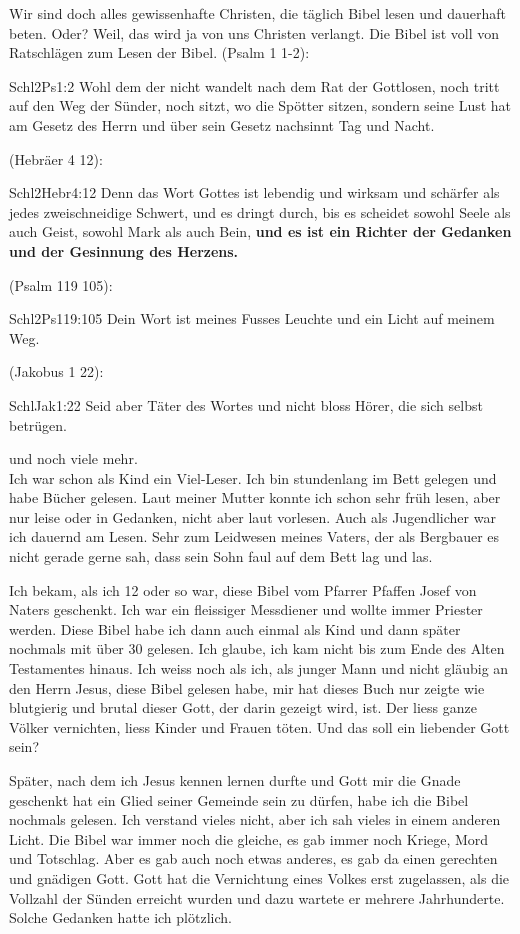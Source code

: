\documentclass[12pt,a4paper]{scrarticle}
\begin{document}
Wir sind doch alles gewissenhafte Christen, die täglich Bibel lesen und dauerhaft beten. Oder? Weil, das wird ja von uns Christen verlangt. Die Bibel ist voll von Ratschlägen zum Lesen der Bibel. 
(Psalm 1 1-2):
\begin{bibeltext}{Schl2}{Ps}{1:2}
Wohl dem der nicht wandelt nach dem Rat der Gottlosen, noch tritt auf den Weg der Sünder, noch sitzt, wo die Spötter sitzen, sondern seine Lust hat am Gesetz des Herrn und über sein Gesetz nachsinnt Tag und Nacht.
\end{bibeltext}
(Hebräer 4 12):
\begin{bibeltext}{Schl2}{Hebr}{4:12}
Denn das Wort Gottes ist lebendig und wirksam und schärfer als jedes zweischneidige Schwert, und es dringt durch, bis es scheidet sowohl Seele als auch Geist, sowohl Mark als auch Bein, \textbf{und es ist ein Richter der Gedanken und der Gesinnung des Herzens.}
\end{bibeltext}
(Psalm 119 105):
\begin{bibeltext}{Schl2}{Ps}{119:105}
Dein Wort ist meines Fusses Leuchte und ein Licht auf meinem Weg.
\end{bibeltext}
(Jakobus 1 22):
\begin{bibeltext}{Schl}{Jak}{1:22}
Seid aber Täter des Wortes und nicht bloss Hörer, die sich selbst betrügen.
\end{bibeltext}
und noch viele mehr.\\
Ich war schon als Kind ein Viel-Leser. Ich bin stundenlang im Bett gelegen und habe Bücher gelesen. Laut meiner Mutter konnte ich schon sehr früh lesen, aber nur leise oder in Gedanken, nicht aber laut vorlesen. Auch als Jugendlicher war ich dauernd am Lesen. Sehr zum Leidwesen meines Vaters, der als Bergbauer es nicht gerade gerne sah, dass sein Sohn faul auf dem Bett lag und las.

Ich bekam, als ich 12 oder so war, diese Bibel vom Pfarrer Pfaffen Josef von Naters geschenkt. Ich war ein fleissiger Messdiener und wollte immer Priester werden. Diese Bibel habe ich dann auch einmal als Kind und dann später nochmals mit über 30 gelesen. Ich glaube, ich kam nicht bis zum Ende des Alten Testamentes hinaus. Ich weiss noch als ich, als  junger Mann und nicht gläubig an den Herrn Jesus, diese Bibel gelesen habe, mir hat dieses Buch nur zeigte wie blutgierig und brutal dieser Gott, der darin gezeigt wird, ist. Der liess ganze Völker vernichten, liess Kinder und Frauen töten. Und das soll ein liebender Gott sein?

Später, nach dem ich Jesus kennen lernen durfte und Gott mir die Gnade geschenkt hat ein Glied seiner Gemeinde sein zu dürfen, habe ich die Bibel nochmals gelesen. Ich verstand vieles nicht, aber ich sah vieles in einem anderen Licht. Die Bibel war immer noch die gleiche, es gab immer noch Kriege, Mord und Totschlag. Aber es gab auch noch etwas anderes, es gab da einen gerechten und gnädigen Gott. Gott hat die Vernichtung eines Volkes erst zugelassen, als die Vollzahl der Sünden erreicht wurden und dazu wartete er mehrere Jahrhunderte. Solche Gedanken hatte ich plötzlich.
\end{document}
